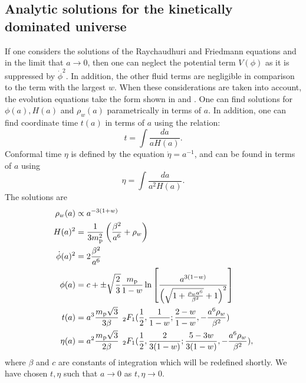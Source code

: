 \subsection{Analytic solutions for the kinetically dominated universe} 
If one considers the solutions of the Raychaudhuri and Friedmann
equations  and  in
the limit that $a\to0$, then one can neglect the potential term
$V(\phi)$ as it is suppressed by $\dot{\phi}^2$. In addition, the
other fluid terms are negligible in comparison to the term with the
largest $w$.  When these considerations are taken into account, the
evolution equations take the form shown in  and
. One can find solutions for
$\phi(a),H(a)$ and $\rho_w(a)$ parametrically in terms of $a$.  In
addition, one can find coordinate time $t(a)$ in terms of $a$ using
the relation:
%
\begin{equation}
  t = \int \frac{da}{aH(a)}.
\end{equation}
%
Conformal time $\eta$ is defined by the equation $\dot{\eta} =
a^{-1}$, and can be found in terms of $a$ using
%
\begin{equation}
  \eta = \int \frac{da}{a^2H(a)}.
\end{equation}
%
The solutions are
%
\begin{align}
  \rho_w(a) 
  &\propto 
  a^{-3(1+w)} 
  \\
  H(a)^2 
  &= 
  \frac{1}{3m_{\mathrm{p}}^2}\left(\frac{\beta^2}{a^6} + \rho_w\right)  
  \label{eqn:H_of_a}
  \\
  \dot{\phi}(a)^2
  &=
  2\frac{\beta^2}{a^6} 
  \label{eqn:dotphi_of_a}
  \\
  \phi(a)
  &=
  c + \pm
  \sqrt{\frac{2}{3}}\frac{m_{\mathrm{p}}}{1-w} \ln \left[ 
  \frac 
  {{a}^{3(1-w)}}
  {\left(\sqrt {1+\frac{\rho_wa^{6}}{\beta^2}}+1\right)^2} 
  \right]  
  \label{eqn:phi_of_a}
  \\
  t(a)
  &=
  a^3 \frac{m_{\mathrm{p}}\sqrt{3}}{3\beta} 
  \:\: 
  {_2F_1}(
  \frac{1}{2},
  \frac{1}{1-w};
  \frac{2-w}{1-w},
  -\frac{a^6\rho_w}{\beta^2}
  ) 
  \label{eqn:t_of_a}
  \\
  \eta(a) 
  &= 
  a^2 \frac{m_{\mathrm{p}}\sqrt{3}}{2\beta}
  \:\: 
  {_2F_1}(
  \frac{1}{2},
  \frac{2}{3(1-w)};
  \frac{5-3w}{3(1-w)},
  -\frac{a^6\rho_w}{\beta^2}
  ),
  \label{eqn:eta_of_a}
\end{align}
%
where $\beta$ and $c$ are constants of integration which will be
redefined shortly. We have chosen $t,\eta$ such that $a\to0$ as
$t,\eta \to 0$.


